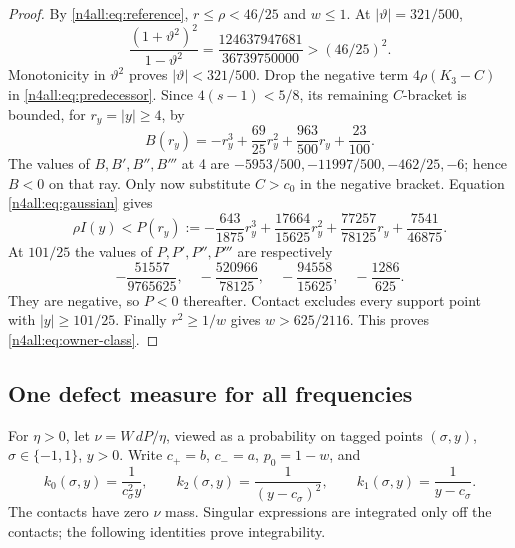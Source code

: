 \documentclass[11pt,a4paper]{article}
\numberwithin{equation}{section}
\theoremstyle{definition}
\theoremstyle{remark}
\begin{document}
\begin{proof}
By \eqref{n4all:eq:reference}, $r\le\rho<46/25$ and $w\le1$.
At $|\vartheta|=321/500$,
\[
 \frac{(1+\vartheta^2)^2}{1-\vartheta^2}
   =\frac{124637947681}{36739750000}>(46/25)^2.
\]
Monotonicity in $\vartheta^2$ proves $|\vartheta|<321/500$.
Drop the negative term $4\rho(K_3-C)$ in
\eqref{n4all:eq:predecessor}. Since $4(s-1)<5/8$, its remaining
$C$-bracket is bounded, for $r_y=|y|\ge4$, by
\[
 B(r_y)=-r_y^3+\frac{69}{25}r_y^2
                 +\frac{963}{500}r_y+\frac{23}{100}.
\]
The values of $B,B',B'',B'''$ at 4 are
$-5953/500,-11997/500,-462/25,-6$; hence $B<0$ on that ray.
Only now substitute $C>c_0$ in the negative bracket. Equation
\eqref{n4all:eq:gaussian} gives
\[
 \rho I(y)<P(r_y):=-\frac{643}{1875}r_y^3
 +\frac{17664}{15625}r_y^2+\frac{77257}{78125}r_y
 +\frac{7541}{46875}.
\]
At $101/25$ the values of $P,P',P'',P'''$ are respectively
\[
 -\frac{51557}{9765625},\quad -\frac{520966}{78125},\quad
 -\frac{94558}{15625},\quad -\frac{1286}{625}.
\]
They are negative, so $P<0$ thereafter. Contact excludes every
support point with $|y|\ge101/25$. Finally $r^2\ge1/w$ gives
$w>625/2116$. This proves \eqref{n4all:eq:owner-class}.
\end{proof}

\subsection{One defect measure for all frequencies}
For $\eta>0$, let $\nu=W\,dP/\eta$, viewed as a probability on
tagged points $(\sigma,y)$, $\sigma\in\{-1,1\}$, $y>0$.
Write $c_+=b$, $c_-=a$, $p_0=1-w$, and
\[
 k_0(\sigma,y)=\frac1{c_\sigma^2y},\qquad
 k_2(\sigma,y)=\frac1{(y-c_\sigma)^2},\qquad
 k_1(\sigma,y)=\frac1{y-c_\sigma}.
\]
The contacts have zero $\nu$ mass. Singular expressions are integrated
only off the contacts; the following identities prove integrability.
\end{document}
